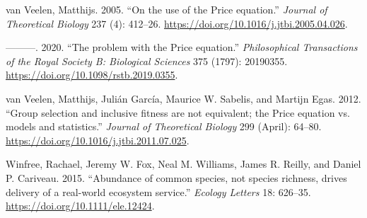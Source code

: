 \documentclass[
]{article}
\newlength{\cslhangindent}
\newlength{\cslentryspacingunit} %
\newenvironment{CSLReferences}[2] %
 {%
  \setlength{\parindent}{0pt}
  \ifodd #1
  \let\oldpar\par
  \def\par{\hangindent=\cslhangindent\oldpar}
  \fi
  \setlength{\parskip}{#2\cslentryspacingunit}
 }%
 {}
\begin{document}
\begin{CSLReferences}{1}{0}
\leavevmode{}%
van Veelen, Matthijs. 2005. {``{On the use of the Price equation}.''}
\emph{Journal of Theoretical Biology} 237 (4): 412--26.
\url{https://doi.org/10.1016/j.jtbi.2005.04.026}.

\leavevmode{}%
---------. 2020. {``{The problem with the Price equation}.''}
\emph{Philosophical Transactions of the Royal Society B: Biological
Sciences} 375 (1797): 20190355.
\url{https://doi.org/10.1098/rstb.2019.0355}.

\leavevmode{}%
van Veelen, Matthijs, Julián García, Maurice W. Sabelis, and Martijn
Egas. 2012. {``{Group selection and inclusive fitness are not
equivalent; the Price equation vs. models and statistics}.''}
\emph{Journal of Theoretical Biology} 299 (April): 64--80.
\url{https://doi.org/10.1016/j.jtbi.2011.07.025}.

\leavevmode{}%
Winfree, Rachael, Jeremy W. Fox, Neal M. Williams, James R. Reilly, and
Daniel P. Cariveau. 2015. {``{Abundance of common species, not species
richness, drives delivery of a real-world ecosystem service}.''}
\emph{Ecology Letters} 18: 626--35.
\url{https://doi.org/10.1111/ele.12424}.

\end{CSLReferences}
\end{document}

